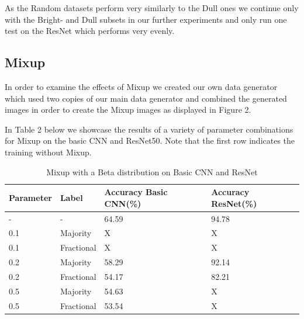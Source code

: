 \documentclass{article}
\begin{document}

As the Random datasets perform very similarly to the Dull ones we continue only with the Bright- and Dull subsets in our further experiments and only run one test on the ResNet which performs very evenly. 

\subsection{Mixup}

In order to examine the effects of Mixup we created our own data generator which used two copies of our main data generator and combined the generated images in order to create the Mixup images as displayed in Figure 2.

In Table 2 below we showcase the results of a variety of parameter combinations for Mixup on the basic CNN and ResNet50. Note that the first row indicates the training without Mixup.

\begin{table}[H]
	\caption{Mixup with a Beta distribution on Basic CNN and ResNet}
	\label{sample-table}
	\centering
	\begin{tabular}{llll}
		\toprule
		Parameter & Label & Accuracy Basic CNN(\%)& Accuracy ResNet(\%) \\
		\midrule
		 -   & -        & 64.59   &   94.78 \\
		 0.1 & Majority & X       & X \\
		 0.1 & Fractional & X     & X\\ 
		 0.2 & Majority & 58.29   & 92.14 \\
		 0.2 & Fractional & 54.17 & 82.21\\ 
		 0.5 & Majority & 54.63   & X\\
		 0.5 & Fractional & 53.54 & X\\
		\bottomrule
	\end{tabular}
\end{table}
\end{document}
